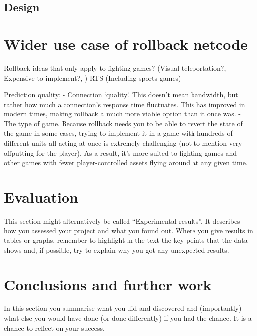 \documentclass{entcs}
\begin{document}
\subsection{Design}

\section{Wider use case of rollback netcode}
Rollback ideas that only apply to fighting games? (Visual teleportation?, Expensive to implement?, ) 
 RTS (Including sports games)

Prediction quality:
- Connection ‘quality’. This doesn’t mean bandwidth, but rather how much a connection’s response time fluctuates. This has improved in modern times, making rollback a much more viable option than it once was.
- The type of game. Because rollback needs you to be able to revert the state of the game in some cases, trying to implement it in a game with hundreds of different units all acting at once is extremely challenging (not to mention very offputting for the player). As a result, it’s more suited to fighting games and other games with fewer player-controlled assets flying around at any given time.

\section{Evaluation}

This section might alternatively be called “Experimental results”.  It describes how you assessed your project and what you found out. Where you give results in tables or graphs, remember to highlight in the text the key points that the data shows and, if possible, try to explain why you got any unexpected results.

\section{Conclusions and further work}

In this section you summarise what you did and discovered and (importantly) what else you would have done (or done differently) if you had the chance. It is a chance to reflect on your success.
\end{document}
